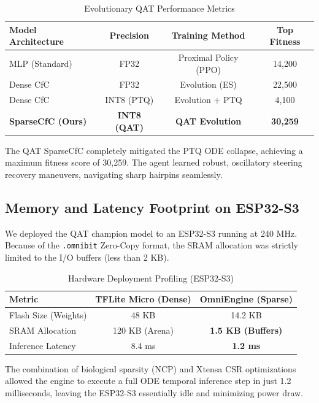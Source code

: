 \documentclass[lettersize,journal]{IEEEtran}
\begin{document}
\begin{table}[!ht]
\caption{Evolutionary QAT Performance Metrics}
\centering
\begin{tabular}{@{}l c c c@{}}
\toprule
\textbf{Model Architecture} & \textbf{Precision} & \textbf{Training Method} & \textbf{Top Fitness} \\
\midrule
MLP (Standard)              & FP32               & Proximal Policy (PPO)    & 14,200 \\
Dense CfC                   & FP32               & Evolution (ES)           & 22,500 \\
Dense CfC                   & INT8 (PTQ)         & Evolution + PTQ          & 4,100  \\
\textbf{SparseCfC (Ours)}   & \textbf{INT8 (QAT)}& \textbf{QAT Evolution}   & \textbf{30,259} \\
\bottomrule
\end{tabular}
\end{table}

The QAT SparseCfC completely mitigated the PTQ ODE collapse, achieving a maximum fitness score of 30,259. The agent learned robust, oscillatory steering recovery maneuvers, navigating sharp hairpins seamlessly.

\subsection{Memory and Latency Footprint on ESP32-S3}
We deployed the QAT champion model to an ESP32-S3 running at 240 MHz. Because of the \texttt{.omnibit} Zero-Copy format, the SRAM allocation was strictly limited to the I/O buffers (less than 2 KB).

\begin{table}[!ht]
\caption{Hardware Deployment Profiling (ESP32-S3)}
\centering
\begin{tabular}{@{}l c c@{}}
\toprule
\textbf{Metric} & \textbf{TFLite Micro (Dense)} & \textbf{OmniEngine (Sparse)} \\
\midrule
Flash Size (Weights)  & 48 KB & 14.2 KB \\
SRAM Allocation       & 120 KB (Arena) & \textbf{1.5 KB (Buffers)} \\
Inference Latency     & 8.4 ms & \textbf{1.2 ms} \\
\bottomrule
\end{tabular}
\end{table}

The combination of biological sparsity (NCP) and Xtensa CSR optimizations allowed the engine to execute a full ODE temporal inference step in just 1.2 milliseconds, leaving the ESP32-S3 essentially idle and minimizing power draw.
\end{document}
